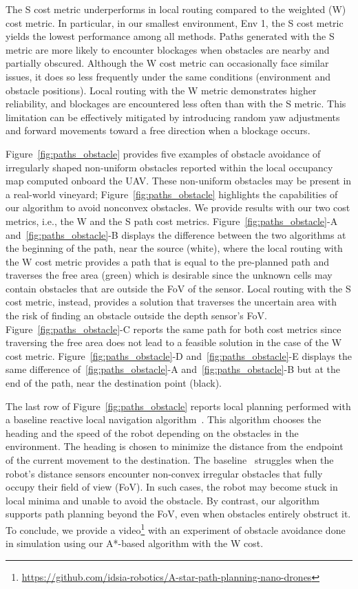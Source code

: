 The S cost metric underperforms in local routing compared to the weighted (W) cost metric. In particular, in our smallest environment, Env 1, the S cost metric yields the lowest performance among all methods. Paths generated with the S metric are more likely to encounter blockages when obstacles are nearby and partially obscured. Although the W cost metric can occasionally face similar issues, it does so less frequently under the same conditions (environment and obstacle positions). Local routing with the W metric demonstrates higher reliability, and blockages are encountered less often than with the S metric. This limitation can be effectively mitigated by introducing random yaw adjustments and forward movements toward a free direction when a blockage occurs.

Figure~\ref{fig:paths_obstacle} provides five examples of obstacle avoidance of irregularly shaped non-uniform obstacles reported within the local occupancy map computed onboard the UAV. 
These non-uniform obstacles may be present in a real-world vineyard; Figure~\ref {fig:paths_obstacle} highlights the capabilities of our algorithm to avoid nonconvex obstacles.
We provide results with our two cost metrics, i.e., the W and the S path cost metrics.
Figure~\ref{fig:paths_obstacle}-A and~\ref{fig:paths_obstacle}-B displays the difference between the two algorithms at the beginning of the path, near the source (white), where the local routing with the W cost metric provides a path that is equal to the pre-planned path and traverses the free area (green) which is desirable since the unknown cells may contain obstacles that are outside the FoV of the sensor.
Local routing with the S cost metric, instead, provides a solution that traverses the uncertain area with the risk of finding an obstacle outside the depth sensor's FoV.
Figure~\ref{fig:paths_obstacle}-C reports the same path for both cost metrics since traversing the free area does not lead to a feasible solution in the case of the W cost metric.
Figure~\ref{fig:paths_obstacle}-D and~\ref{fig:paths_obstacle}-E displays the same difference of~\ref{fig:paths_obstacle}-A and~\ref{fig:paths_obstacle}-B but at the end of the path, near the destination point (black).

The last row of Figure~\ref{fig:paths_obstacle} reports local planning performed with a baseline reactive local navigation algorithm~\cite{6630610}.
This algorithm chooses the heading and the speed of the robot depending on the obstacles in the environment.
The heading is chosen to minimize the distance from the endpoint of the current movement to the destination.
The baseline~\cite{6630610} struggles when the robot’s distance sensors encounter non-convex irregular obstacles that fully occupy their field of view (FoV). In such cases, the robot may become stuck in local minima and unable to avoid the obstacle. 
By contrast, our algorithm supports path planning beyond the FoV, even when obstacles entirely obstruct it.
To conclude, we provide a video\footnote{\href{https://github.com/idsia-robotics/A-star-path-planning-nano-drones}{https://github.com/idsia-robotics/A-star-path-planning-nano-drones}} with an experiment of obstacle avoidance done in simulation using our A*-based algorithm with the W cost.

